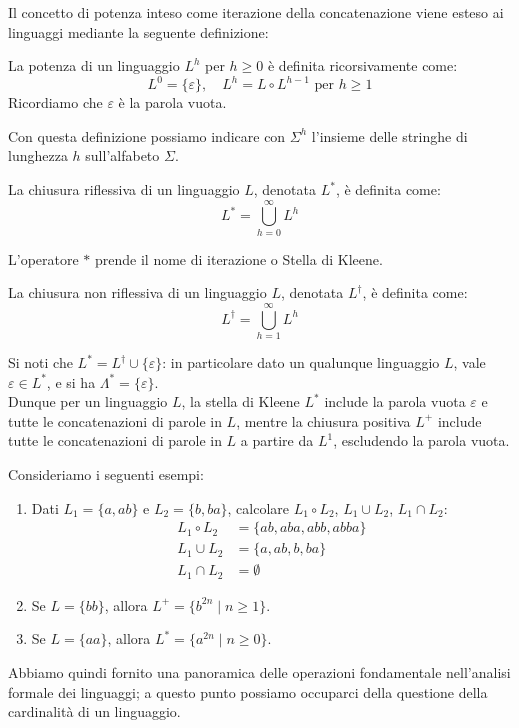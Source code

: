 \documentclass{article}
\begin{document}
\noindent Il concetto di potenza inteso come iterazione della concatenazione  viene esteso ai linguaggi mediante la seguente definizione:
\begin{definition} %
La potenza di un linguaggio \( L^h \) per \( h \geq 0 \) è definita ricorsivamente come:
\[ L^0 = \{\varepsilon\}, \quad L^h = L \circ L^{h-1} \text{ per } h \geq 1 \]
Ricordiamo che \( \varepsilon \) è la parola vuota.
\end{definition}
\noindent Con questa definizione possiamo indicare con \( \Sigma^h \) l'insieme delle stringhe di lunghezza \( h \) sull'alfabeto \( \Sigma \).
\begin{definition}
La chiusura riflessiva di un linguaggio \( L \), denotata \( L^* \), è definita come:
\[ 
L^* = \bigcup_{h=0}^{\infty} L^h 
\]
\end{definition}
\noindent L'operatore \( * \) prende il nome di iterazione o Stella di Kleene.
\begin{definition} La chiusura non riflessiva di un linguaggio \( L \), denotata \( L^\dagger \), è definita come:
\[ 
L^\dagger = \bigcup_{h=1}^{\infty} L^h 
\]
\end{definition}
\noindent Si noti che \( L^* = L^\dagger \cup \{\varepsilon\} \): in particolare dato un qualunque linguaggio \( L \), vale \( \varepsilon \in L^* \), e si ha \( \Lambda^* = \{\varepsilon\} \).
\\\noindent
Dunque per un linguaggio \( L \), la stella di Kleene \( L^* \) include la parola vuota \( \varepsilon \) e tutte le concatenazioni di parole in \( L \), mentre la chiusura positiva \( L^+ \) include tutte le concatenazioni di parole in \( L \) a partire da \( L^1 \), escludendo la parola vuota.
\begin{example}
Consideriamo i seguenti esempi:
\begin{enumerate}
   \item Dati \( L_1 = \{a, ab\} \) e \( L_2 = \{b, ba\} \), calcolare \( L_1 \circ L_2 \), \( L_1 \cup L_2 \), \( L_1 \cap L_2 \):
    \begin{align*}
        L_1 \circ L_2 &= \{ab, aba, abb, abba\} \\
        L_1 \cup L_2 &= \{a, ab, b, ba\} \\
        L_1 \cap L_2 &= \emptyset
    \end{align*}

    \item Se \( L = \{bb\} \), allora \( L^+ = \{b^{2n} \mid n \geq 1\} \).

    \item Se \( L = \{aa\} \), allora \( L^* = \{a^{2n} \mid n \geq 0\} \).

\end{enumerate}
\end{example}
\noindent
Abbiamo quindi fornito una panoramica delle operazioni fondamentale nell'analisi formale dei linguaggi; a questo punto possiamo occuparci della questione della cardinalità di un linguaggio.
\end{document}
